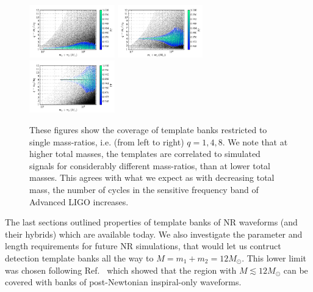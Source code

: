 
\begin{figure}
\begin{center}
\includegraphics[width=0.33\textwidth, trim=17 20 75 40]{bank_separate_q1_mtot200_match-tiny.png}
\includegraphics[width=0.33\textwidth, trim=17 20 75 40]{bank_separate_q4_mtot200_match-tiny.png}
\includegraphics[width=0.33\textwidth, trim=17 20 75 40]{bank_separate_q8_mtot200_match-tiny.png}
\caption{\label{fig:separate_q148} These figures show the coverage of template
  banks restricted to single mass-ratios, i.e. (from left to right) 
  $q = 1, 4, 8$. We note that at 
  higher total masses, the templates are correlated to simulated signals for
  considerably different mass-ratios, than at lower total masses. This agrees
  with what we expect as with decreasing total mass, the number of cycles in
  the sensitive frequency band of Advanced LIGO increases.} 
\end{center}
\end{figure}

The last sections outlined properties of template banks of NR
waveforms (and their hybrids) which are available today. 
We also investigate the parameter and length requirements for future NR 
simulations, that would let us contruct detection template banks all the
way to $M=m_1+m_2=12M_\odot$. This lower limit was chosen following 
Ref.~\cite{Brown:2012nn,CompTemplates2009} which showed that the region with
$M\lesssim 12M_\odot$ can be covered with banks of post-Newtonian inspiral-only
waveforms.

